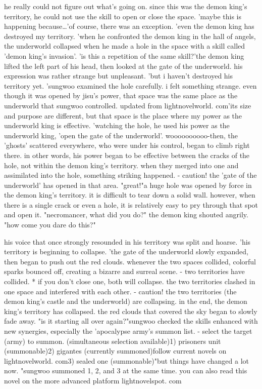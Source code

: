  he really could not figure out what's going on.
 since this was the demon king's territory, he could not use the skill to open or close the space.
'maybe this is happening because…'of course, there was an exception.
 'even the demon king has destroyed my territory.
'when he confronted the demon king in the hall of angels, the underworld collapsed when he made a hole in the space with a skill called 'demon king's invasion'.
'is this a repetition of the same skill?'the demon king lifted the left part of his head, then looked at the gate of the underworld.
 his expression was rather strange but unpleasant.
'but i haven't destroyed his territory yet.
'sungwoo examined the hole carefully.
 i felt something strange.
even though it was opened by jisu's power, that space was the same place as the underworld that sungwoo controlled.
 updated from lightnovelworld.
c‌om'its size and purpose are different, but that space is the place where my power as the underworld king is effective.
'watching the hole, he used his power as the underworld king, 'open the gate of the underworld'.
woooooooooo-then, the 'ghosts' scattered everywhere, who were under his control, began to climb right there.
 in other words, his power began to be effective between the cracks of the hole, not within the demon king's territory.
when they merged into one and assimilated into the hole, something striking happened.
 - caution! the 'gate of the underworld' has opened in that area.
"great!"a huge hole was opened by force in the demon king's territory.
 it is difficult to tear down a solid wall.
 however, when there is a single crack or even a hole, it is relatively easy to pry through that spot and open it.
 "necromancer, what did you do?" the demon king shouted angrily.
 "how come you dare do this?"

his voice that once strongly resounded in his territory was split and hoarse.
'his territory is beginning to collapse.
'the gate of the underworld slowly expanded, then began to push out the red clouds.
 whenever the two spaces collided, colorful sparks bounced off, creating a bizarre and surreal scene.
- two territories have collided.
* if you don't close one, both will collapse.
the two territories clashed in one space and interfered with each other.
 - caution! the two territories (the demon king's castle and the underworld) are collapsing.
 in the end, the demon king's territory has collapsed.
the red clouds that covered the sky began to slowly fade away.
 "is it starting all over again?"sungwoo checked the skills enhanced with new synergies, especially the 'apocalypse army's summon list.
- select the target (army) to summon.
 (simultaneous selection available)1) prisoners unit (summonable)2) gigantes (currently summoned)follow current novels on lightnovelworld.
com3) sealed one (summonable)"but things have changed a lot now.
"sungwoo summoned 1, 2, and 3 at the same time.
 you can also read this novel on the more advanced platform lightnovelspot.
com

 